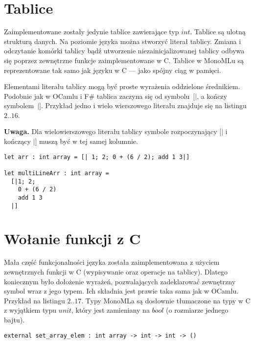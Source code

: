 \documentclass[declaration,shortabstract]{iithesis}
\begin{document}

\section{Tablice}

Zaimplementowane zostały jedynie tablice zawierające typ $int$. Tablice są 
ulotną strukturą danych. Na poziomie języka można stworzyć literał tablicy.
Zmiana i odczytanie komórki tablicy bądź utworzenie niezainicjalizowanej 
tablicy odbywa się poprzez zewnętrzne funkcje zaimplementowane w C. 
Tablice w MonoMLu są reprezentowane tak samo jak języku w C --- jako spójny
ciąg w pamięci.

Elementami literału tablicy mogą być proste wyrażenia oddzielone średnikiem. 
Podobnie jak w OCamlu i F\# tablica zaczyna się od symbolu~$[|$, a 
kończy symbolem~$|]$. Przykład jedno i wielo wierszowego literału znajduje się 
na listingu $2..16$.

\textbf{Uwaga.} Dla wielowierszowego literału tablicy symbole rozpoczynający 
$[|$ i kończący $|]$ muszą być w tej samej kolumnie.

\begin{lstlisting}[frame=single, caption=Tablice.]
let arr : int array = [| 1; 2; 0 + (6 / 2); add 1 3|]

let multiLineArr : int array = 
  [|1; 2;
    0 + (6 / 2)
    add 1 3
  |]
\end{lstlisting}

\section{Wołanie funkcji z C}

Mała część funkcjonalności języka została zaimplementowana z użyciem 
zewnętrznych funkcji w C (wypisywanie oraz operacje na tablicy). Dlatego 
koniecznym było dołożenie wyrażeń, pozwalających zadeklarować zewnętrzny symbol 
wraz z jego typem. Ich składnia jest prawie taka sama jak w OCamlu. Przykład
na listingu $2..17$. 
Typy MonoMLa są dosłownie tłumaczone na typy w C z wyjątkiem typu $unit$, który 
jest zamieniany na $bool$ (o rozmiarze jednego bajtu).

\begin{lstlisting}[frame=single, caption=Interfejs zewnętrzny.]
external set_array_elem : int array -> int -> int -> () 
\end{lstlisting}


\end{document}
